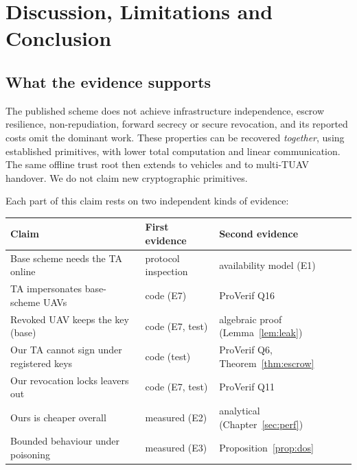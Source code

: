 \chapter{Discussion, Limitations and Conclusion}\label{ch:conclusion}

\section{What the evidence supports}
\begin{keybox}[title={Our claim, stated precisely}]
The published scheme does not achieve infrastructure independence, escrow resilience, non-repudiation, forward secrecy or secure revocation, and its reported
costs omit the dominant work. These properties can be recovered \emph{together}, using established primitives, with lower total computation and linear
communication. The same offline trust root then extends to vehicles and to multi-TUAV handover. We do not claim new cryptographic primitives.
\end{keybox}
Each part of this claim rests on two independent kinds of evidence:
\begin{center}\small
\begin{tabularx}{\linewidth}{@{}>{\raggedright\arraybackslash}X l l@{}}
\toprule
Claim & First evidence & Second evidence\\
\midrule
Base scheme needs the TA online & protocol inspection & availability model (E1)\\
TA impersonates base-scheme UAVs & code (E7) & ProVerif Q16\\
Revoked UAV keeps the key (base) & code (E7, test) & algebraic proof (Lemma~\ref{lem:leak})\\
Our TA cannot sign under registered keys & code (test) & ProVerif Q6, Theorem~\ref{thm:escrow}\\
Our revocation locks leavers out & code (E7, test) & ProVerif Q11\\
Ours is cheaper overall & measured (E2) & analytical (Chapter~\ref{sec:perf})\\
Bounded behaviour under poisoning & measured (E3) & Proposition~\ref{prop:dos}\\
\bottomrule
\end{tabularx}
\end{center}

